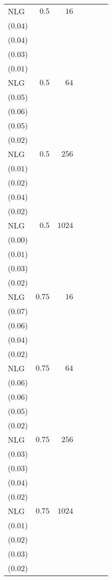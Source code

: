 \begin{table}[t]
\begin{tabular}{lrrrrrr}
NLG & \(0.5\) & \(16\) & \longcell{\(0.47\)\\{\tiny(\(0.04\))}} & \longcell{\(0.39\)\\{\tiny(\(0.04\))}} & \longcell{\(0.26\)\\{\tiny(\(0.03\))}} & \longcell{\(0.10\)\\{\tiny(\(0.01\))}} \\[2.2ex]
NLG & \(0.5\) & \(64\) & \longcell{\(0.78\)\\{\tiny(\(0.05\))}} & \longcell{\(0.66\)\\{\tiny(\(0.06\))}} & \longcell{\(0.46\)\\{\tiny(\(0.05\))}} & \longcell{\(0.18\)\\{\tiny(\(0.02\))}} \\[2.2ex]
NLG & \(0.5\) & \(256\) & \longcell{\(0.93\)\\{\tiny(\(0.01\))}} & \longcell{\(0.85\)\\{\tiny(\(0.02\))}} & \longcell{\(0.64\)\\{\tiny(\(0.04\))}} & \longcell{\(0.26\)\\{\tiny(\(0.02\))}} \\[2.2ex]
NLG & \(0.5\) & \(1024\) & \longcell{\(0.96\)\\{\tiny(\(0.00\))}} & \longcell{\(0.93\)\\{\tiny(\(0.01\))}} & \longcell{\(0.75\)\\{\tiny(\(0.03\))}} & \longcell{\(0.33\)\\{\tiny(\(0.02\))}} \\[2.2ex]
NLG & \(0.75\) & \(16\) & \longcell{\(0.30\)\\{\tiny(\(0.07\))}} & \longcell{\(0.27\)\\{\tiny(\(0.06\))}} & \longcell{\(0.20\)\\{\tiny(\(0.04\))}} & \longcell{\(0.09\)\\{\tiny(\(0.02\))}} \\[2.2ex]
NLG & \(0.75\) & \(64\) & \longcell{\(0.67\)\\{\tiny(\(0.06\))}} & \longcell{\(0.59\)\\{\tiny(\(0.06\))}} & \longcell{\(0.42\)\\{\tiny(\(0.05\))}} & \longcell{\(0.17\)\\{\tiny(\(0.02\))}} \\[2.2ex]
NLG & \(0.75\) & \(256\) & \longcell{\(0.87\)\\{\tiny(\(0.03\))}} & \longcell{\(0.79\)\\{\tiny(\(0.03\))}} & \longcell{\(0.60\)\\{\tiny(\(0.04\))}} & \longcell{\(0.25\)\\{\tiny(\(0.02\))}} \\[2.2ex]
NLG & \(0.75\) & \(1024\) & \longcell{\(0.95\)\\{\tiny(\(0.01\))}} & \longcell{\(0.91\)\\{\tiny(\(0.02\))}} & \longcell{\(0.74\)\\{\tiny(\(0.03\))}} & \longcell{\(0.33\)\\{\tiny(\(0.02\))}} \\[2.2ex]
\bottomrule
\end{tabular}
\end{table}
